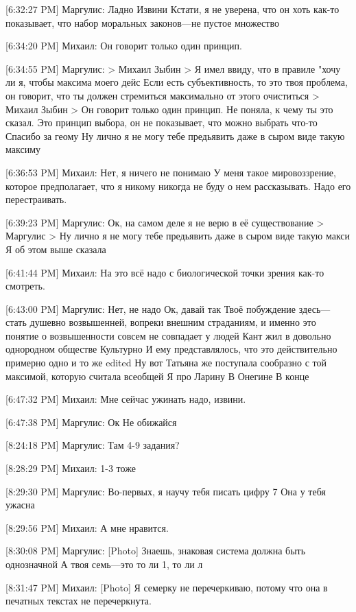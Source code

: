 \documentclass{article}
\begin{document}
[6:32:27 PM] Маргулис:
Ладно
 Извини
 Кстати, я не уверена, что он хоть как-то показывает, что набор моральных законов—не пустое множество

[6:34:20 PM] Михаил:
Он говорит только один принцип.

[6:34:55 PM] Маргулис:
> Михаил Зыбин
> Я имел ввиду, что в правиле "хочу ли я, чтобы максима моего дейс
Если есть субъективность, то это твоя проблема, он говорит, что ты должен стремиться максимально от этого очиститься
> Михаил Зыбин
> Он говорит только один принцип.
Не поняла, к чему ты это сказал. Это принцип выбора, он не показывает, что можно выбрать что-то
 Спасибо за геому
 Ну лично я не могу тебе предьявить даже в сыром виде такую максиму

[6:36:53 PM] Михаил:
Нет, я ничего не понимаю
 У меня такое мировоззрение, которое предполагает, что я никому никогда не буду о нем рассказывать. Надо его перестраивать.

[6:39:23 PM] Маргулис:
Ок, на самом деле я не верю в её существование
> Маргулис
> Ну лично я не могу тебе предьявить даже в сыром виде такую макси
Я об этом выше сказала

[6:41:44 PM] Михаил:
На это всё надо с биологической точки зрения как-то смотреть.

[6:43:00 PM] Маргулис:
Нет, не надо
 Ок, давай так 
Твоё побуждение здесь—стать душевно возвышенней, вопреки внешним страданиям, и именно это понятие о возвышенности совсем не совпадает у людей
 Кант жил в довольно однородном обществе
 Культурно
 И ему представлялось, что это действительно примерно одно и то же
edited 
Ну вот Татьяна же поступала сообразно с той максимой, которую считала всеобщей
 Я про Ларину
 В Онегине
 В конце

[6:47:32 PM] Михаил:
Мне сейчас ужинать надо, извини.

[6:47:38 PM] Маргулис:
Ок
 Не обижайся

[8:24:18 PM] Маргулис:
Там 4-9 задания?

[8:28:29 PM] Михаил:
1-3 тоже

[8:29:30 PM] Маргулис:
Во-первых, я научу тебя писать цифру 7
 Она у тебя ужасна

[8:29:56 PM] Михаил:
А мне нравится.

[8:30:08 PM] Маргулис:
[Photo]
 Знаешь, знаковая система должна быть однозначной
 А твоя семь—это то ли 1, то ли л

[8:31:47 PM] Михаил:
[Photo]
 Я семерку не перечеркиваю, потому что она в печатных текстах не перечеркнута.
\end{document}

